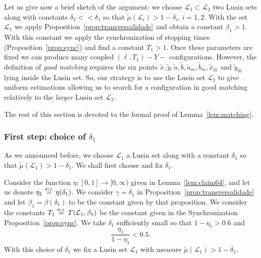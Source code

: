 \documentclass[a4paper,11pt,reqno]{amsart}
\newcommand{\cL}{{\mathcal L}}
\newcommand{\eqdef}{\stackrel{\scriptscriptstyle\textrm def.}{=}}
\newcommand{\tix}{\tilde{x}}
\newcommand{\ta}{\tilde{a}}
\newcommand{\tb}{\tilde{b}}
\newcommand{\tm}{\tilde{\mu}}
\theoremstyle{definition}
\begin{document}
Let us give now a brief sketch of the argument: we choose $\cL_1\subset\cL_2$ two Lusin sets along with constants $\delta_2<<\delta_1$ so that $\tm(\cL_i)>1-\delta_i$, $i=1,2$. With the set $\cL_1$ we apply Proposition~\ref{prop:transversalidade} and obtain a constant $\beta_1>1$. With this constant we apply the synchronization of stopping times (Proposition~\ref{prop:sync}) and find a constant $T_1>1$. Once these parameters are fixed we can produce many coupled $(\ell,T_1)-Y-$ configurations. However, the definition of \emph{good matching} requires the six points $\tix,\tilde{y},\ta,\tb,\ta_m,\tb_m,\tix_{\hat{m}}$ and $\tilde{y}_{\hat{m}}$ lying inside the Lusin set. So, our strategy is to use the Lusin set $\cL_1$ to give uniform estimations allowing us to search for a configuration in good matching relatively to the \emph{larger} Lusin set $\cL_2$. 

The rest of this section is devoted to the formal proof of Lemma~\ref{lem:matching}.

\subsubsection{First step: choice of $\delta_1$}
As we announced before, we choose $\cL_1$ a Lusin set along with a constant $\delta_1$ so that $\tm(\cL_1)>1-\delta_1$. We shall first choose and fix $\delta_1$. 

Consider the function $\eta:[0,1]\to[0,\infty)$ given in Lemma~\ref{lem:claim64}, and let us denote $\eta_1\eqdef\eta(\delta_1)$. We consider $\gamma=\delta_1$ in Proposition~\ref{prop:transversalidade} and let $\beta_1=\beta(\delta_1)$ to be the constant given by that proposition.  We consider the constants $T_1\eqdef T(\cL_1,\beta_1)$ be the constant given in the Synchronization Proposition~\ref{prop:sync}. We take $\delta_1$ sufficiently small so that $1-\eta_1>0.6$ and
\begin{equation}
	\label{eq:etaum}
\frac{\eta_1}{1-\eta_1}<0.5.
\end{equation}
With this choice of $\delta_1$ we fix a Lusin set $\cL_1$ with measure $\tm(\cL_1)>1-\delta_1$. 
\end{document}
